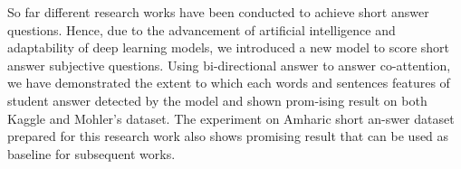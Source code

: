 So far different research works have been conducted to achieve short answer questions. Hence, due to the advancement of artificial intelligence and adaptability of deep learning models, we introduced a new model to score short answer subjective questions. Using bi-directional answer to answer co-attention, we have demonstrated the extent to which each words and sentences features of student answer detected by the model and shown prom-ising result on both Kaggle and Mohler's dataset. The experiment on Amharic short an-swer dataset prepared for this research work also shows promising result that can be used as baseline for subsequent works.
